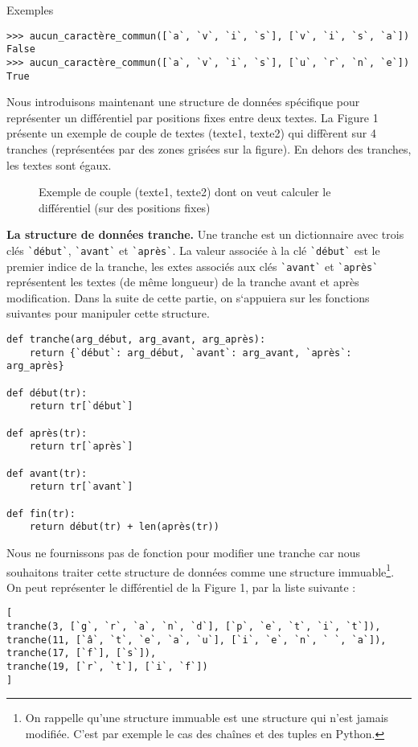 Exemples
\begin{lstlisting}
>>> aucun_caractère_commun([`a`, `v`, `i`, `s`], [`v`, `i`, `s`, `a`])
False
>>> aucun_caractère_commun([`a`, `v`, `i`, `s`], [`u`, `r`, `n`, `e`])
True
\end{lstlisting}

Nous introduisons maintenant une structure de données spécifique pour représenter un différentiel par positions fixes entre deux textes.
La Figure 1 présente un exemple de couple de textes (texte1, texte2) qui diffèrent sur 4
tranches (représentées par des zones grisées sur la figure). En dehors des tranches, les textes sont
égaux.

\begin{figure}[H]
\caption{Exemple de couple (texte1, texte2) dont on veut calculer le différentiel (sur des
positions fixes)}
\end{figure}

\textbf{La structure de données tranche.} Une tranche est un dictionnaire avec trois clés \lstinline{`début`},
\lstinline{`avant`} et \lstinline{`après`}. La valeur associée à la clé \lstinline{`début`} est le premier indice de la tranche, les
extes associés aux clés \lstinline{`avant`} et \lstinline{`après`} représentent les textes (de même longueur) de la
tranche avant et après modification. Dans la suite de cette partie, on s`appuiera sur les fonctions
suivantes pour manipuler cette structure.


\begin{lstlisting}
def tranche(arg_début, arg_avant, arg_après):
    return {`début`: arg_début, `avant`: arg_avant, `après`: arg_après}

def début(tr):
    return tr[`début`]

def après(tr):
    return tr[`après`]

def avant(tr):
    return tr[`avant`]

def fin(tr):
    return début(tr) + len(après(tr))
\end{lstlisting}

Nous ne fournissons pas de fonction pour modifier une tranche car nous souhaitons traiter
cette structure de données comme une structure immuable\footnote{On rappelle qu’une structure immuable est une structure qui n’est jamais modifiée. C’est par exemple le
cas des chaînes et des tuples en Python.}.
On peut représenter le différentiel de la Figure 1, par la liste suivante :

\begin{lstlisting}
[
tranche(3, [`g`, `r`, `a`, `n`, `d`], [`p`, `e`, `t`, `i`, `t`]),
tranche(11, [`â`, `t`, `e`, `a`, `u`], [`i`, `e`, `n`, ` `, `a`]),
tranche(17, [`f`], [`s`]),
tranche(19, [`r`, `t`], [`i`, `f`])
]
\end{lstlisting}


